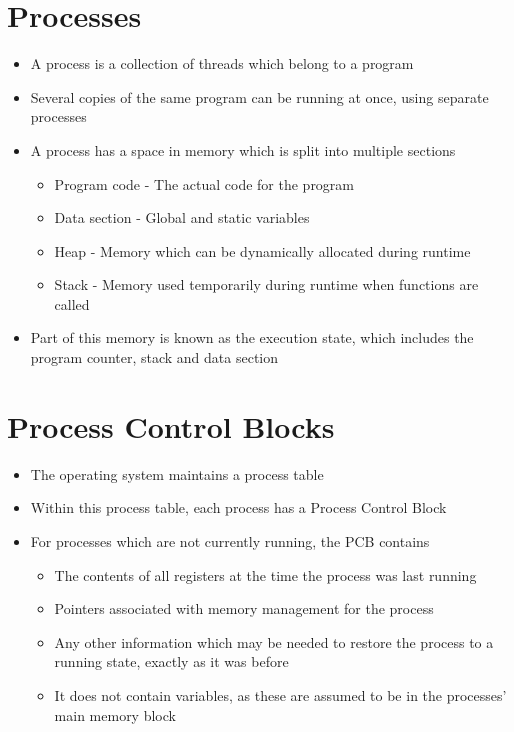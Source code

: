 
\section*{Processes}

\begin{itemize}
  \item A process is a collection of threads which belong to a program
  \item Several copies of the same program can be running at once, using separate processes
  \item A process has a space in memory which is split into multiple sections
  \begin{itemize}
    \item Program code - The actual code for the program
    \item Data section - Global and static variables
    \item Heap - Memory which can be dynamically allocated during runtime
    \item Stack - Memory used temporarily during runtime when functions are called
  \end{itemize}
  \item Part of this memory is known as the execution state, which includes the program counter, stack and data section
\end{itemize}

\section*{Process Control Blocks}

\begin{itemize}
  \item The operating system maintains a process table
  \item Within this process table, each process has a Process Control Block
  \item For processes which are not currently running, the PCB contains
  \begin{itemize}
    \item The contents of all registers at the time the process was last running
    \item Pointers associated with memory management for the process
    \item Any other information which may be needed to restore the process to a running state, exactly as it was before
    \item It does not contain variables, as these are assumed to be in the processes' main memory block
  \end{itemize}
\end{itemize}

